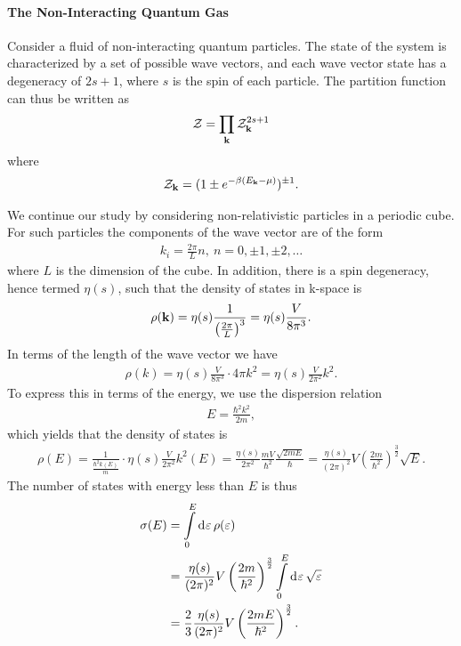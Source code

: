 \paragraph{The Non-Interacting Quantum Gas}
Consider a fluid of non-interacting quantum particles. The state of the system is characterized by a set of possible wave vectors, and each wave vector state has a degeneracy of $2s + 1$, where $s$ is the spin of each particle. The partition function can thus be written as
\begin{align*}
	\mathcal{Z} = \prod\limits_{\vb{k}}\mathcal{Z}_{\vb{k}}^{2s + 1}
\end{align*}
where
\begin{align*}
	\mathcal{Z}_{\vb{k}} = (1 \pm e^{-\beta(E_{\vb{k}} - \mu)})^{\pm 1}.
\end{align*}


We continue our study by considering non-relativistic particles in a periodic cube. For such particles the components of the wave vector are of the form
\begin{align*}
	k_{i} = \frac{2\pi}{L}n,\ n = 0, \pm 1, \pm 2, \dots
\end{align*}
where $L$ is the dimension of the cube. In addition, there is a spin degeneracy, hence termed $\eta(s)$, such that the density of states in k-space is
\begin{align*}
	\rho(\vb{k}) = \eta(s)\frac{1}{\left(\frac{2\pi}{L}\right)^{3}} = \eta(s)\frac{V}{8\pi^{3}}.
\end{align*}
In terms of the length of the wave vector we have
\begin{align*}
	\rho(k) = \eta(s)\frac{V}{8\pi^{3}}\cdot 4\pi k^{2} = \eta(s)\frac{V}{2\pi^{2}}k^{2}.
\end{align*}
To express this in terms of the energy, we use the dispersion relation
\begin{align*}
	E = \frac{\hbar^{2}k^{2}}{2m},
\end{align*}
which yields that the density of states is
\begin{align*}
	\rho(E) = \frac{1}{\frac{\hbar^{2}k(E)}{m}}\cdot \eta(s)\frac{V}{2\pi^{2}}k^{2}(E) = \frac{\eta(s)}{2\pi^{2}}\frac{mV}{\hbar^{2}}\frac{\sqrt{2mE}}{\hbar} = \frac{\eta(s)}{(2\pi)^{2}}V\left(\frac{2m}{\hbar^{2}}\right)^{\frac{3}{2}}\sqrt{E}.
\end{align*}
The number of states with energy less than $E$ is thus
\begin{align*}
	\sigma(E) &= \int\limits_{0}^{E}\dd[]{\varepsilon}\rho(\varepsilon) \\
	          &= \frac{\eta(s)}{(2\pi)^{2}}V\left(\frac{2m}{\hbar^{2}}\right)^{\frac{3}{2}}\int\limits_{0}^{E}\dd[]{\varepsilon}\sqrt{\varepsilon} \\
	          &= \frac{2}{3}\frac{\eta(s)}{(2\pi)^{2}}V\left(\frac{2mE}{\hbar^{2}}\right)^{\frac{3}{2}}.
\end{align*}

